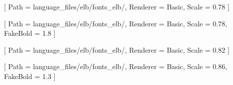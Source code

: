 %

[
  Path = language_files/elb/fonts_elb/,
  Renderer = Basic,
  Scale = 0.78
]

[
  Path = language_files/elb/fonts_elb/,
  Renderer = Basic,
  Scale = 0.78,
  FakeBold = 1.8
]

[
  Path = language_files/elb/fonts_elb/,
  Renderer = Basic,
  Scale = 0.82
]

[
  Path = language_files/elb/fonts_elb/,
  Renderer = Basic,
  Scale = 0.86,
  FakeBold = 1.3
]

